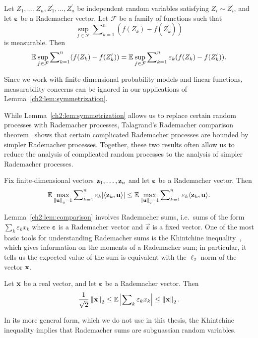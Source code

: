 \begin{lemma}
Let $Z_1, \ldots, Z_n, Z_1^\prime, \ldots, Z_n^\prime$ be independent random
variables satisfying $Z_i \sim Z_i^\prime$, and let $\boldsymbol{\varepsilon}$
be a Rademacher vector. Let $\mathcal{F}$ be a family of functions such that 
\[
\sup_{f \in \mathcal{F}} \sum\nolimits_{k=1}^n (f(Z_k) - f(Z_k^\prime))
\]
is measurable. Then 
\[
\mathbb{E} \sup_{f \in \mathcal{F}} \sum\nolimits_{k=1}^n (f(Z_k) - f(Z_k^\prime)) = \mathbb{E}
\sup_{f \in \mathcal{F}} \sum\nolimits_{k=1}^n \varepsilon_k (f(Z_k) -
f(Z_k^\prime)).
\]
\label{ch2:lem:symmetrization}
\end{lemma}
Since we work with finite-dimensional probability models and linear functions,
measurability concerns can be ignored in our applications of Lemma~\ref{ch2:lem:symmetrization}.

While Lemma~\ref{ch2:lem:symmetrization} allows us to replace certain 
random processes with Rademacher processes, Talagrand's Rademacher comparison 
theorem~\cite[Theorem 4.12 et seq.]{LT91} shows that certain 
complicated Rademacher processes are bounded by simpler Rademacher processes.
Together, these two results often allow us to reduce the analysis of complicated
random processes to the analysis of simpler Rademacher processes. 

\begin{lemma}
Fix finite-dimensional vectors $\mathbf{z}_{1},\ldots,\mathbf{z}_{n}$ and let
$\boldsymbol{\varepsilon}$ be a Rademacher vector. Then \[
\mathbb{E}\max_{\left\|\mathbf{u}\right\|_q = 1}\sum\nolimits_{k=1}^{n}\varepsilon_k|\langle\mathbf{z}_{k},\mathbf{u}
\rangle|\leq\mathbb{E}\max_{\left\|\mathbf{u}\right\|_q = 1}\sum\nolimits_{k=1}^{n}\varepsilon_{k}\langle\mathbf{z}_
{k},\mathbf{u}\rangle.\]
 \label{ch2:lem:comparison}
\end{lemma}

Lemma~\ref{ch2:lem:comparison} involves Rademacher sums, i.e.\ sums of the form
$\sum_k \varepsilon_k x_k$ where $\boldsymbol{\varepsilon}$ is a Rademacher
vector and $\vec{x}$ is a fixed vector. One of the most basic tools for understanding 
Rademacher sums is the Khintchine 
inequality~\cite{Szarek78}, which gives information on the moments of a Rademacher 
sum; in particular, it tells us
the expected value of the sum is equivalent with the $\ell_2$ norm of the vector
$\mathbf{x}$.

\begin{lemma}
Let $\mathbf{x}$ be a real vector, and let $\boldsymbol{\varepsilon}$ be a
Rademacher vector. Then 
\[
\frac{1}{\sqrt{2}}\left\|\mathbf{x}\right\|_{2}\leq\mathbb{E}\left|\sum\nolimits_{k}\varepsilon_{k}
x_{k}\right|\leq\left\|\mathbf{x}\right\|_{2}.
\]
\label{chprelim:lem:khintchine}
\end{lemma}
In its more general form, which we do not use in this thesis, the Khintchine 
inequality implies that Rademacher sums are subguassian random variables.


